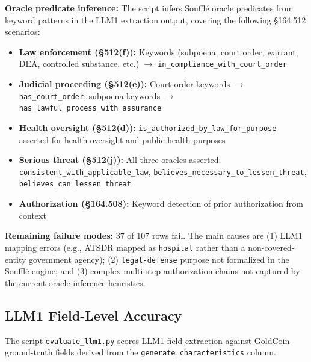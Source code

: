 \documentclass[11pt,letterpaper]{article}
\begin{document}
\begin{appendices}
\textbf{Oracle predicate inference:} The script infers Souffl\'{e} oracle predicates from keyword patterns in the LLM1 extraction output, covering the following \S 164.512 scenarios:

\begin{itemize}
  \item \textbf{Law enforcement (\S 512(f)):} Keywords (subpoena, court order, warrant, DEA, controlled substance, etc.) $\to$ \texttt{in\_compliance\_with\_court\_order}
  \item \textbf{Judicial proceeding (\S 512(e)):} Court-order keywords $\to$ \texttt{has\_court\_order}; subpoena keywords $\to$ \texttt{has\_lawful\_process\_with\_assurance}
  \item \textbf{Health oversight (\S 512(d)):} \texttt{is\_authorized\_by\_law\_for\_purpose} asserted for health-oversight and public-health purposes
  \item \textbf{Serious threat (\S 512(j)):} All three oracles asserted: \texttt{consistent\_with\_applicable\_law}, \texttt{believes\_necessary\_to\_lessen\_threat}, \texttt{believes\_can\_lessen\_threat}
  \item \textbf{Authorization (\S 164.508):} Keyword detection of prior authorization from context
\end{itemize}

\textbf{Remaining failure modes:} 37 of 107 rows fail. The main causes are (1) LLM1 mapping errors (e.g., ATSDR mapped as \texttt{hospital} rather than a non-covered-entity government agency); (2) \texttt{legal-defense} purpose not formalized in the Souffl\'{e} engine; and (3) complex multi-step authorization chains not captured by the current oracle inference heuristics.

\subsection{LLM1 Field-Level Accuracy}
\label{sec:llm1-accuracy}

The script \texttt{evaluate\_llm1.py} scores LLM1 field extraction against GoldCoin ground-truth fields derived from the \texttt{generate\_characteristics} column.


\end{appendices}
\end{document}
